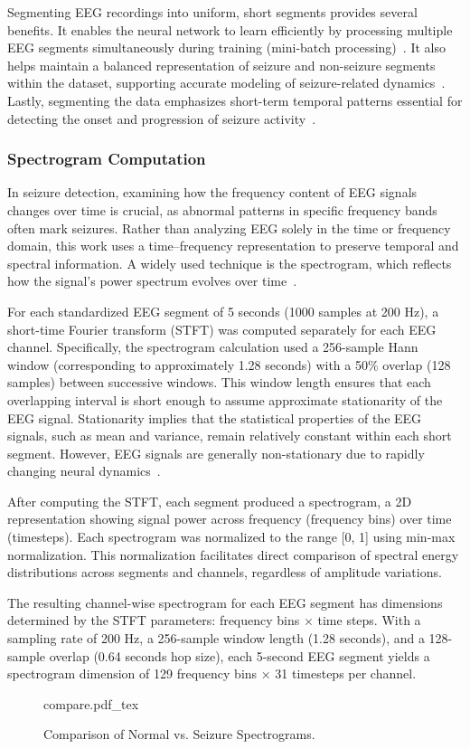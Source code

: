 Segmenting EEG recordings into uniform, short segments provides several benefits. It enables the neural network to learn efficiently by processing multiple EEG segments simultaneously during training (mini-batch processing)~\cite{EEGSignalAnalysis}. It also helps maintain a balanced representation of seizure and non-seizure segments within the dataset, supporting accurate modeling of seizure-related dynamics~\cite{EEGSignalAnalysis}. Lastly, segmenting the data emphasizes short-term temporal patterns essential for detecting the onset and progression of seizure activity~\cite{EEGSignalAnalysis}.

\subsubsection{Spectrogram Computation}
In seizure detection, examining how the frequency content of EEG signals changes over time is crucial, as abnormal patterns in specific frequency bands often mark seizures. Rather than analyzing EEG solely in the time or frequency domain, this work uses a time–frequency representation to preserve temporal and spectral information. A widely used technique is the spectrogram, which reflects how the signal’s power spectrum evolves over time~\cite{EEGSignalAnalysis}.

For each standardized EEG segment of 5 seconds (1000 samples at 200 Hz), a short-time Fourier transform (STFT) was computed separately for each EEG channel. Specifically, the spectrogram calculation used a 256-sample Hann window (corresponding to approximately 1.28 seconds) with a 50\% overlap (128 samples) between successive windows. This window length ensures that each overlapping interval is short enough to assume approximate stationarity of the EEG signal. Stationarity implies that the statistical properties of the EEG signals, such as mean and variance, remain relatively constant within each short segment. However, EEG signals are generally non-stationary due to rapidly changing neural dynamics~\cite{EEGSignalAnalysis}.

After computing the STFT, each segment produced a spectrogram, a 2D representation showing signal power across frequency (frequency bins) over time (timesteps). Each spectrogram was normalized to the range [0, 1] using min-max normalization. This normalization facilitates direct comparison of spectral energy distributions across segments and channels, regardless of amplitude variations.

The resulting channel-wise spectrogram for each EEG segment has dimensions determined by the STFT parameters: frequency bins × time steps. With a sampling rate of 200 Hz, a 256-sample window length (1.28 seconds), and a 128-sample overlap (0.64 seconds hop size), each 5-second EEG segment yields a spectrogram dimension of 129 frequency bins × 31 timesteps per channel.
\begin{figure}[htb]
	\centering
    \def\svgwidth{400pt}
 	{compare.pdf_tex} 	 	
	\caption[Comparison of Normal vs. Seizure Spectrograms]{Comparison of Normal vs. Seizure Spectrograms.}
	\label{fig:psd}
\end{figure}

